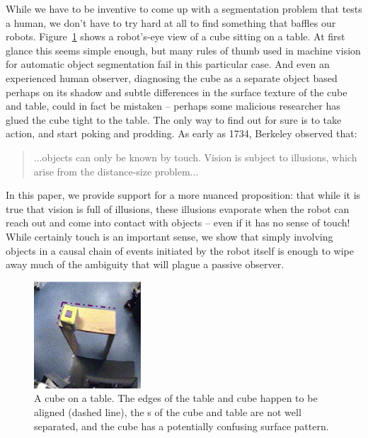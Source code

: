 While we have to be inventive to come up with a segmentation problem
that tests a human, we don't have to try hard at all to find something
that baffles our robots.  Figure~\ref{fig:setup-sequence} shows a
robot's-eye view of a cube sitting on a table. At first glance this
seems simple enough, but many rules of thumb used in machine vision
for automatic object segmentation fail in this particular case.  And
even an experienced human observer, diagnosing the cube as a separate
object based perhaps on its shadow and subtle differences in the
surface texture of the cube and table, could in fact be mistaken --
perhaps some malicious researcher has glued the cube tight to the table.  The only way to
find out for sure is to take action, and start poking and prodding.
As early as 1734, Berkeley observed that:
%
\begin{quote}
...objects can only be known by
touch. Vision is subject to illusions, which arise from the
distance-size problem... \cite{berkeley72new}
\end{quote}
%
In this paper, we provide support for a more nuanced proposition: that
while it is true that vision is full of illusions, these illusions
evaporate when the robot can reach out and come into contact with
objects -- even if it has no sense of touch!  While certainly touch is
an important sense, we show that simply involving objects in a causal
chain of events initiated by the robot itself is enough to wipe away much
of the ambiguity that will plague a passive observer.

%
\begin{figure}[tbh]
\begin{center}
\includegraphics[width=4cm]{setup-sequence.eps}
\caption{ 
\label{fig:setup-sequence}
%
A cube on a table. The edges of the table and cube happen to be
aligned (dashed line), the \ahhcolor{}s of the cube and table are not well
separated, and the cube has a potentially confusing surface pattern.
%
}
\end{center}
\end{figure}


